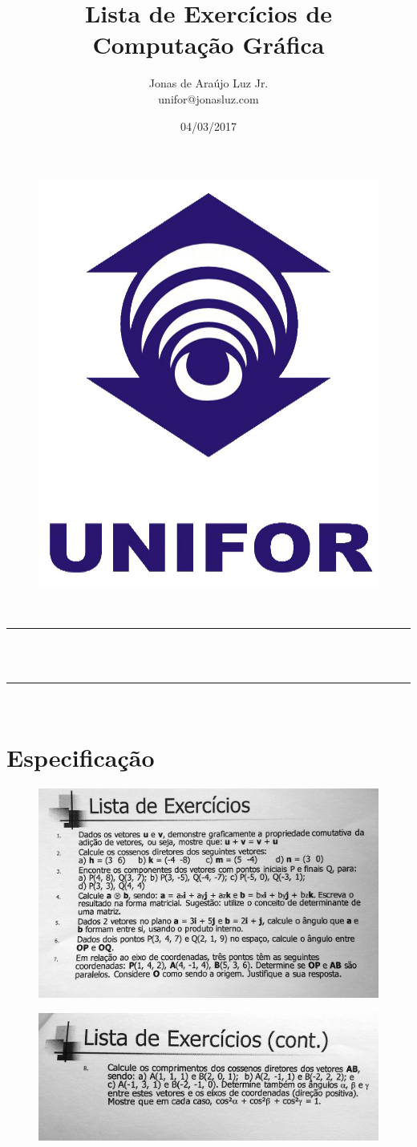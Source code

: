 \documentclass[a4paper,11pt,pagenumber=true]{article}
\makeatletter
\newcommand{\linia}{\rule{\linewidth}{0.5pt}}
\theoremstyle{mytheor}
\renewcommand{\maketitle}{
    \begin{center}
        \vspace{2ex}
        {\huge \textsc{\@title}}
        \vspace{1ex}\\
        \linia\\
        \@author\\ 
        \linia\\
        \vspace{1ex}
        \textsc{\the\institution} 
        \hfill \@date
        \vspace{4ex}
    \end{center}
}
\makeatother
\begin{document}
    \title{Lista de Exercícios de\\Computação Gráfica }

    \author{Jonas de Araújo Luz Jr.\\
    unifor@jonasluz.com}
    \date{04/03/2017}
    
    \begin{figure}[t]
    \centering
        \includegraphics[width=.2\textwidth]{images/logo-UNIFOR.jpg}
        \label{fig:logo}    
    \end{figure}
    
    \maketitle
    \tableofcontents
    \newpage
    
    \section{Especificação}

        \begin{figure}[h]
        \centering
            \includegraphics[width=1\textwidth]{images/Especificacao-1.jpg}
            \label{fig:spec1}    
        \end{figure}
        \begin{figure}[h]
        \centering
            \includegraphics[width=1\textwidth]{images/Especificacao-2.jpg}
            \label{fig:spec2}    
        \end{figure}
\end{document}
